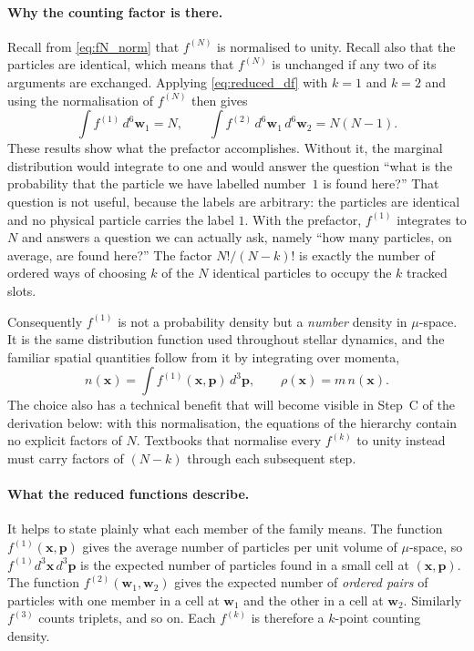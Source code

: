 \documentclass[12pt]{article}
\renewcommand{\vec}[1]{\bm{#1}}
\begin{document}
\paragraph{Why the counting factor is there.}  Recall from
\eqref{eq:fN_norm} that $f^{(N)}$ is normalised to unity.  Recall also
that the particles are identical, which means that $f^{(N)}$ is
unchanged if any two of its arguments are exchanged.  Applying
\eqref{eq:reduced_df} with $k=1$ and $k=2$ and using the normalisation
of $f^{(N)}$ then gives
%
\begin{equation}
  \int f^{(1)}\,d^6\vec w_1 = N,
  \qquad
  \int f^{(2)}\,d^6\vec w_1\,d^6\vec w_2 = N(N-1).
  \label{eq:reduced_df_norm}
\end{equation}
%
These results show what the prefactor accomplishes.  Without it, the
marginal distribution would integrate to one and would answer the
question ``what is the probability that the particle we have labelled
number~$1$ is found here?''  That question is not useful, because the
labels are arbitrary: the particles are identical and no physical
particle carries the label $1$.  With the prefactor, $f^{(1)}$
integrates to $N$ and answers a question we can actually ask, namely
``how many particles, on average, are found here?''  The factor
$N!/(N-k)!$ is exactly the number of ordered ways of choosing $k$ of
the $N$ identical particles to occupy the $k$ tracked slots.

Consequently $f^{(1)}$ is not a probability density but a \emph{number}
density in $\mu$-space.  It is the same distribution function used
throughout stellar dynamics, and the familiar spatial quantities follow
from it by integrating over momenta,
%
\begin{equation}
  n(\vec x) = \!\int\! f^{(1)}(\vec x,\vec p)\,d^3\vec p,
  \qquad
  \rho(\vec x) = m\,n(\vec x).
  \label{eq:n_from_f1}
\end{equation}
%
The choice also has a technical benefit that will become visible in
Step~C of the derivation below: with this normalisation, the equations
of the hierarchy contain no explicit factors of $N$.  Textbooks that
normalise every $f^{(k)}$ to unity instead must carry factors of
$(N-k)$ through each subsequent step.

\paragraph{What the reduced functions describe.}  It helps to state
plainly what each member of the family means.  The function
$f^{(1)}(\vec x,\vec p)$ gives the average number of particles per unit
volume of $\mu$-space, so $f^{(1)}d^3\vec x\,d^3\vec p$ is the expected
number of particles found in a small cell at $(\vec x,\vec p)$.  The
function $f^{(2)}(\vec w_1,\vec w_2)$ gives the expected number of
\emph{ordered pairs} of particles with one member in a cell at
$\vec w_1$ and the other in a cell at $\vec w_2$.  Similarly $f^{(3)}$
counts triplets, and so on.  Each $f^{(k)}$ is therefore a $k$-point
counting density.
\end{document}
